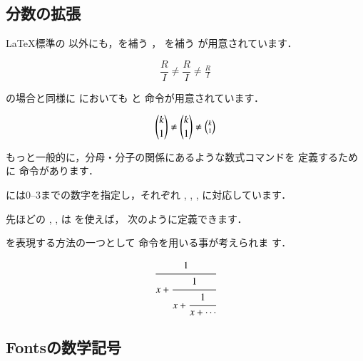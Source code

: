 \subsection{分数の拡張}

\LaTeX 標準の  以外にも，を補う ，
 を補う が用意されています．

\begin{InOut}
\[ \frac{R}{I} \neq \dfrac{R}{I}
   \neq \tfrac{R}{I} \]
\end{InOut}

\begin{Exe}
の場合と同様に においても  と 
命令が用意されています．

\begin{InOut}
\[ \binom{k}{1} \neq \dbinom{k}{1}
\neq \tbinom{k}{1} \]
\end{InOut}
\end{Exe}

もっと一般的に，分母・分子の関係にあるような数式コマンドを
定義するために 命令があります．

\begin{Syntax}
\end{Syntax}

には0--3までの数字を指定し，それぞれ
, 
, 
, 
に対応しています．

先ほどの , ,  は を使えば，
次のように定義できます．

\begin{InTeX}
\newcommand\frac[2]{\genfrac{}{}{}{}{#1}{#2}}
\newcommand\tfrac[2]{\genfrac{}{}{}{1}{#1}{#2}}
\newcommand\binom[2]{\genfrac{(}{)}{0pt}{}{#1}{#2}}
\end{InTeX}

を表現する方法の一つとして 命令を用いる事が考えられま
す．

\begin{InOut}
\begin{displaymath}
  \cfrac{1}{x+
    \cfrac{1}{x+
      \cfrac{1}{x+\dotsb}
    }
  }
\end{displaymath}
\end{InOut}



\subsection{\texorpdfstring{\AmS}{AmS}Fontsの数学記号}


